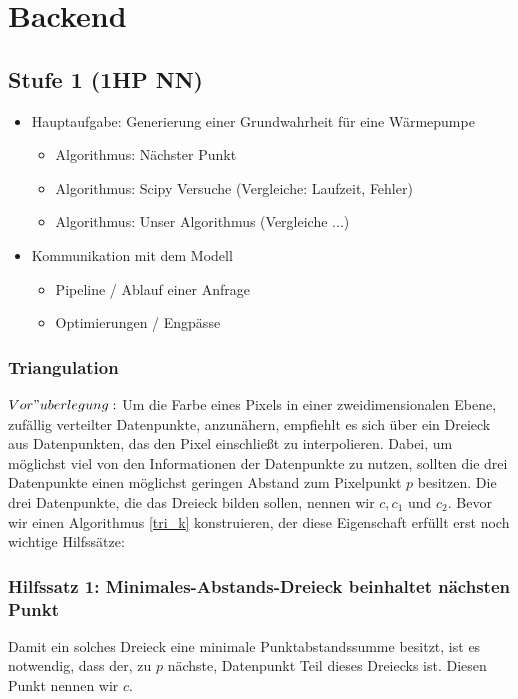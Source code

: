 \documentclass[a4paper]{extarticle}
\begin{document}
    \section{Backend}
    \subsection{Stufe 1 (1HP NN)}
    \begin{itemize}
        \item Hauptaufgabe: Generierung einer Grundwahrheit für eine Wärmepumpe
        \begin{itemize}
            \item Algorithmus: Nächster Punkt
            \item Algorithmus: Scipy Versuche (Vergleiche: Laufzeit, Fehler)
            \item Algorithmus: Unser Algorithmus (Vergleiche ...)
        \end{itemize}
        \item Kommunikation mit dem Modell
        \begin{itemize}
            \item Pipeline / Ablauf einer Anfrage
            \item Optimierungen / Engpässe
        \end{itemize}
    \end{itemize}
    \subsubsection{Triangulation}
    $Vor"uberlegung:$ Um die Farbe eines Pixels in einer zweidimensionalen Ebene, zufällig verteilter
    Datenpunkte, anzunähern, empfiehlt es sich über ein Dreieck aus Datenpunkten, das den Pixel 
    einschließt zu interpolieren. Dabei, um möglichst viel von den Informationen der Datenpunkte 
    zu nutzen, sollten die drei Datenpunkte einen möglichst geringen Abstand zum Pixelpunkt $p$ 
    besitzen. Die drei Datenpunkte, die das Dreieck bilden sollen, nennen wir $c, c_1$ und $c_2$.
    Bevor wir einen Algorithmus \ref{tri_k} konstruieren, der diese Eigenschaft erfüllt erst noch 
    wichtige Hilfssätze:

    \subsubsection{Hilfssatz 1: Minimales-Abstands-Dreieck beinhaltet nächsten Punkt} \label{tri_hs1}
    Damit ein solches Dreieck eine minimale Punktabstandssumme besitzt,
    ist es notwendig, dass der, zu $p$ nächste, Datenpunkt Teil dieses Dreiecks ist. Diesen Punkt 
    nennen wir $c$.
\end{document}
